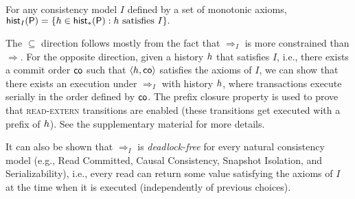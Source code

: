  \begin{theorem}
For any consistency model $I$ defined by a set of monotonic axioms,
$
\histOf[I]{\prog} = \{ h \in \histOf[*]{\prog}: h\mbox{ satisfies }I\}.
$
 \end{theorem}
 
The $\subseteq$ direction follows mostly from the fact that $\Rightarrow_I$ is more constrained than $\Rightarrow$. For the opposite direction, given a history $\hist$ that satisfies $I$, i.e., there exists a commit order $\co$ such that $\tup{h,\co}$ satisfies the axioms of $I$, we can show that there exists an execution under $\Rightarrow_I$ with history $\hist$, where transactions  execute serially in the order defined by $\co$. The prefix closure property is used to prove that \textsc{read-extern} transitions are enabled (these transitions get executed with a prefix of $\hist$). See the supplementary material for more details.
  
It can also be shown that $\Rightarrow_I$ is \emph{deadlock-free} for every natural consistency model (e.g., Read Committed, Causal Consistency, Snapshot Isolation, and Serializability), i.e., every read can return some value satisfying the axioms of $I$ at the time when it is executed (independently of previous choices). 

 
 

